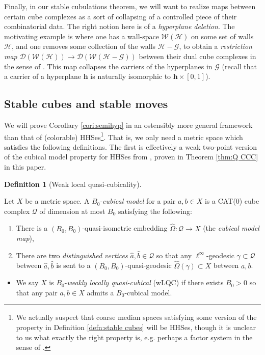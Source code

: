 \documentclass{amsart}
\theoremstyle{definition}
\newtheorem{definition}[theorem]{Definition}
\theoremstyle{remark}
\theoremstyle{definition}
\newcommand{\hh}{{\sf h}}
\newcommand{\calD}{\mathcal{D}}
\newcommand{\calG}{\mathcal{G}}
\newcommand{\calH}{\mathcal{H}}
\newcommand{\calQ}{\mathcal{Q}}
\newcommand{\calW}{\mathcal{W}}
\newcommand{\ha}{\hat{a}}
\newcommand{\hb}{\hat{b}}
\newcommand{\hO}{\widehat{\Omega}}
\renewcommand{\hh}{\mathbf{h}}
\begin{document}
Finally, in our stable cubulations theorem, we will want to realize maps between certain cube complexes as a sort of collapsing of a controlled piece of their combinatorial data.  The right notion here is of a \emph{hyperplane deletion}.  The motivating example is where one has a wall-space $\calW(\calH)$ on some set of walls $\calH$, and one removes some collection of the walls $\calH - \calG$, to obtain a \emph{restriction map} $\calD(\calW(\calH)) \to \calD(\calW(\calH- \calG))$ between their dual cube complexes in the sense of \cite{CapraceSageev}.  This map collapses the carriers of the hyperplanes in $\calG$ (recall that a carrier of a hyperplane $\hh$ is naturally isomorphic to $\hh \times [0,1]$).










\subsection{Stable cubes and stable moves}\label{subsec:stable cubes, early}

We will prove Corollary \ref{cori:semihyp} in an ostensibly more general framework than that of (colorable) HHSes\footnote{We actually suspect that coarse median spaces satisfying some version of the property in Definition \ref{defn:stable cubes} will be HHSes, though it is unclear to us what exactly the right property is, e.g. perhaps a factor system in the sense of \cite{HHS_I}.}.  That is, we only need a metric space which satisfies the following definitions.  The first is effectively a weak two-point version of the cubical model property for HHSes from \cite{HHS_quasi}, proven in Theorem \ref{thm:Q CCC} in this paper.

\begin{definition}[Weak local quasi-cubicality]\label{defn:lqc pair}

Let $X$ be a metric space.  A $B_0$-\emph{cubical model} for a pair $a,b \in X$ is a CAT(0) cube complex $\calQ$ of dimension at most $B_0$ satisfying the following:
\begin{enumerate}
\item There is a $(B_0,B_0)$-quasi-isometric embedding $\hO:\calQ \to X$ (the \emph{cubical model map}),
\item There are two \emph{distinguished vertices} $\ha,\hb \in \calQ$ so that any $\ell^{\infty}$-geodesic $\gamma \subset \calQ$ between $\ha,\hb$ is sent to a $(B_0,B_0)$-quasi-geodesic $\hO(\gamma) \subset X$ between $a,b$.
\end{enumerate}
\begin{itemize}
\item We say $X$ is $B_0$-\emph{weakly locally quasi-cubical} (wLQC) if there exists $B_0>0$ so that any pair $a,b\in X$ admits a $B_0$-cubical model.
\end{itemize}
\end{definition}
\end{document}
